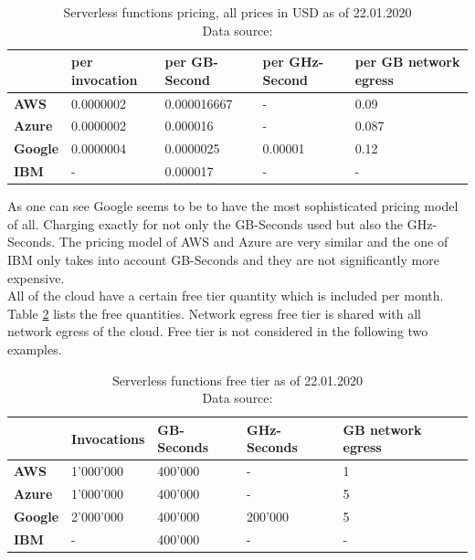 \begin{table}[htp]
\centering
\captionsetup[table]{justification=centering, labelfont=bf}
\begin{tabular}{l|l|l|l|l} 
         & \textbf{per invocation} & \textbf{per GB-Second} & \textbf{per GHz-Second} & \textbf{per GB network egress} \\ \hline
\textbf{AWS}      &  0.0000002  &  0.000016667 &  -       & 0.09 \\ \hline
\textbf{Azure}    &  0.0000002  &  0.000016    &  -       & 0.087 \\ \hline
\textbf{Google}   &  0.0000004  &  0.0000025   &  0.00001 & 0.12 \\ \hline
\textbf{IBM}      &  -          &  0.000017    &  -       & - \\
\end{tabular}
\caption[Serverless functions pricing]{Serverless functions pricing, all prices in USD as of 22.01.2020\\ Data source: \cite{AWSPricing, AzurePricing, GoogleFunctionsPricing,IBMPricing}}
\label{table:pricing}
\end{table}

As one can see Google seems to be to have the most sophisticated pricing model of all. Charging exactly for not only the GB-Seconds used but also the GHz-Seconds. The pricing model of \gls{AWS} and Azure are very similar and the one of \gls{IBM} only takes into account GB-Seconds and they are not significantly more expensive.\\
All of the cloud have a certain free tier quantity which is included per month. Table \ref{table:free_tier} lists the free quantities. Network egress free tier is shared with all network egress of the cloud. Free tier is not considered in the following two examples.

\begin{table}[htp]
\centering
\captionsetup[table]{justification=centering, labelfont=bf}
\begin{tabular}{l|l|l|l|l} 
         & \textbf{Invocations} & \textbf{GB-Seconds} & \textbf{GHz-Seconds} & \textbf{GB network egress} \\ \hline
\textbf{AWS}      &  1'000'000  &  400'000     &  -       & 1 \\ \hline
\textbf{Azure}    &  1'000'000  &  400'000     &  -       & 5 \\ \hline
\textbf{Google}   &  2'000'000  &  400'000     &  200'000 & 5 \\ \hline
\textbf{IBM}      &  -          &  400'000     &  -       & - \\
\end{tabular}
\caption[Serverless functions free tier]{Serverless functions free tier as of 22.01.2020\\Data source: \cite{AWSPricing, AzurePricing, GoogleFunctionsPricing,IBMPricing}}
\label{table:free_tier}
\end{table}

